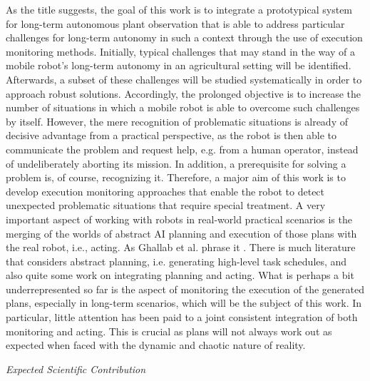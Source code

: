 \documentclass[english, master, utf8]{base/thesis_KBS}
\begin{document}
\noindent
As the title suggests, the goal of this work is to integrate a prototypical system for long-term autonomous plant observation that is able to address 
particular challenges for long-term autonomy in such a context through the use of execution monitoring methods. Initially, typical challenges that may stand in the way of a mobile
robot's long-term autonomy in an agricultural setting will be identified. Afterwards, a subset of these challenges will be studied systematically in order to 
approach robust solutions. Accordingly, the prolonged objective is to increase the number of situations in which a mobile robot is able to 
overcome such challenges by itself. However, the mere recognition of problematic situations is already of decisive advantage from a practical perspective,
as the robot is then able to communicate the problem and request help, e.g. from a human operator, instead of undeliberately aborting its mission.
In addition, a prerequisite for solving a problem is, of course, recognizing it. Therefore, a major aim of this work is to develop execution monitoring
approaches that enable the robot to detect unexpected problematic situations that require special treatment.\newline
A very important aspect of working with robots in real-world practical scenarios is the merging of the worlds of abstract AI planning and execution of those plans with
the real robot, i.e., acting. As Ghallab et al. phrase it . \cite{GNT:2016} There is much literature that considers abstract planning, i.e. generating high-level
task schedules, and also quite some work on integrating planning and acting. What is perhaps a bit underrepresented so far is the aspect of monitoring the execution of the generated
plans, especially in long-term scenarios, which will be the subject of this work. In particular, little attention has been paid to a joint consistent integration of both monitoring
and acting. \cite{Ingrand:2017} This is crucial as plans will not always work out as expected when faced with the dynamic and chaotic nature of reality.\newline

\noindent
\textit{Expected Scientific Contribution}\newline
\end{document}
